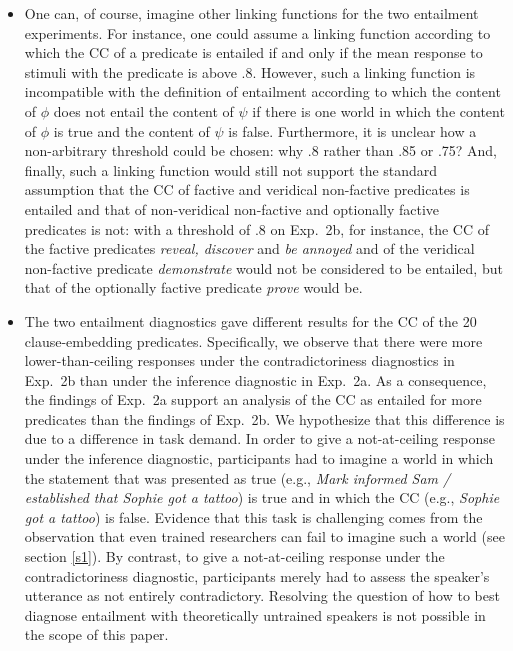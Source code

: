 \documentclass[11pt,fleqn]{article}
\newcommand{\6}{\mbox{$[\hspace*{-.6mm}[$}}
\newcommand{\9}{\mbox{$]\hspace*{-.6mm}]$}}
\begin{document}
{\begin{itemize}
\item One can, of course, imagine other linking functions for the two entailment experiments. For instance, one could assume a linking function according to which the CC of a predicate is entailed if and only if the mean response to stimuli with the predicate is above .8. However, such a linking function is incompatible with the definition of entailment according to which the content of $\phi$ does not entail the content of $\psi$ if there is one world in which the content of $\phi$ is true and the content of $\psi$ is false. Furthermore, it is unclear how a non-arbitrary threshold could be chosen: why .8 rather than .85 or .75? And, finally, such a linking function would still not support the standard assumption that the CC of factive and veridical non-factive predicates is entailed and that of non-veridical non-factive and optionally factive predicates is not: with a threshold of .8 on Exp.~2b, for instance, the CC of the factive predicates {\em reveal, discover} and {\em be annoyed} and of the veridical non-factive predicate {\em demonstrate} would not be considered to be entailed, but that of the optionally factive predicate {\em prove} would be.

\item The two entailment diagnostics gave different results for the CC of the 20 clause-embedding predicates. Specifically, we  observe that there were more lower-than-ceiling responses under the contradictoriness diagnostics in Exp.~2b than under the inference diagnostic in Exp.~2a. As a consequence, the findings of Exp.~2a support an analysis of the CC as  entailed for more predicates than the findings of Exp.~2b. We hypothesize that this difference is due to a difference in task demand. In order to give a not-at-ceiling response under the inference diagnostic, participants had to imagine a world in which the statement that was presented as true (e.g., {\em Mark informed Sam / established that Sophie got a tattoo}) is true and in which the CC (e.g., {\em Sophie got a tattoo}) is false. Evidence that this task is challenging comes from the observation that even trained researchers can fail to imagine such a world (see section \ref{s1}). By contrast, to give a not-at-ceiling response under the contradictoriness diagnostic, participants merely had to assess the speaker's utterance as not entirely contradictory. Resolving the question of how to best diagnose entailment with theoretically untrained speakers is not possible in the scope of this paper. 


\end{itemize}}
\end{document}
